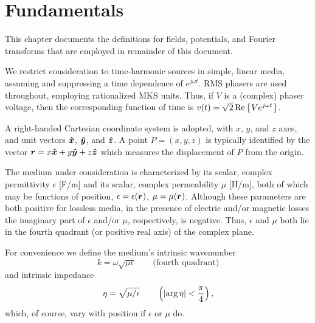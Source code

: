 \chapter{Fundamentals}
\label{chap:fund}
This chapter documents the definitions for fields, potentials, and 
Fourier transforms that are employed in remainder of this document.


We restrict consideration to time-harmonic sources in simple, linear media,
assuming and suppressing
a time dependence of $e^{j\omega t}$.  RMS phasers are used throughout, employing
rationalized MKS units. Thus,
if $V$ is a (complex) phaser voltage, then the corresponding function of time
is $v(t) = \sqrt{2} \operatorname{Re}\left\{V e^{j\omega t}\right\}$.

A right-handed Cartesian  coordinate system is adopted, with $x$, $y$, and 
$z$ axes, and unit vectors $\boldsymbol{\hat{x}}$, $\boldsymbol{\hat{y}}$, and $\boldsymbol{\hat{z}}$.  A point $P = (x,y,z)$ is 
typically identified by the vector $\boldsymbol{r} = x\boldsymbol{\hat{x}} + y\boldsymbol{\hat{y}} + z\boldsymbol{\hat{z}}$ which measures 
the displacement of $P$ from the origin.

The medium under consideration is characterized by its scalar, complex permittivity
$\epsilon$ [F/m] and its scalar, complex permeability $\mu$ [H/m], 
both of which may be functions 
of position, $\epsilon = \epsilon(\boldsymbol{r})$, $\mu = \mu(\boldsymbol{r})$. Although these parameters are
both positive for lossless media, in the presence of electric and/or magnetic
losses the imaginary part of $\epsilon$ and/or $\mu$, respectively, is negative.
Thus, $\epsilon$ and $\mu$ both lie in the fourth quadrant (or positive real
axis) of the complex plane.

For convenience we define the medium's intrinsic wavenumber
\begin{equation}
  k = \omega \sqrt{\mu\epsilon} \qquad \text{(fourth quadrant)}
\end{equation}
and intrinsic impedance
\begin{equation}
  \eta = \sqrt{\mu/\epsilon} \qquad \left(\lvert\arg\eta\rvert < \frac{\pi}{4} \right),
\end{equation}
which, of course, vary with position if $\epsilon$ or $\mu$ do.

